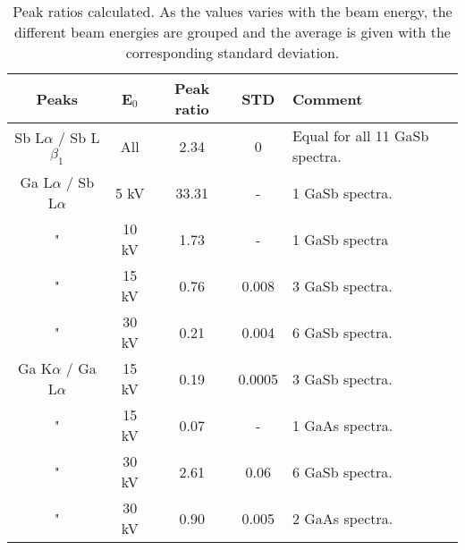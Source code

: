 \begin{table}[phtb]
    \begin{center}
        \caption{
            Peak ratios calculated.
            As the values varies with the beam energy, the different beam energies are grouped and the average is given with the corresponding standard deviation.
        }
        \renewcommand*{\arraystretch}{1.4}
        \label{tab:results:peak_ratios}
        \begin{tabular}{ccccl}
            \hline
            \textbf{Peaks}               & \textbf{E$_0$} & \textbf{Peak ratio} & \textbf{STD} & \textbf{Comment}               \\
            \hline
            Sb L$\alpha$ / Sb L$\beta_1$ & All            & 2.34                & 0            & Equal for all 11 GaSb spectra. \\
            Ga L$\alpha$ / Sb L$\alpha$  & 5 kV           & 33.31               & -            & 1 GaSb spectra.                \\
            "                            & 10 kV          & 1.73                & -            & 1 GaSb spectra                 \\
            "                            & 15 kV          & 0.76                & 0.008        & 3 GaSb spectra.                \\
            "                            & 30 kV          & 0.21                & 0.004        & 6 GaSb spectra.                \\
            Ga K$\alpha$ / Ga L$\alpha$  & 15 kV          & 0.19                & 0.0005       & 3 GaSb spectra.                \\
            "                            & 15 kV          & 0.07                & -            & 1 GaAs spectra.                \\
            "                            & 30 kV          & 2.61                & 0.06         & 6 GaSb spectra.                \\
            "                            & 30 kV          & 0.90                & 0.005        & 2 GaAs spectra.                \\
            \hline
        \end{tabular}
    \end{center}
\end{table}
